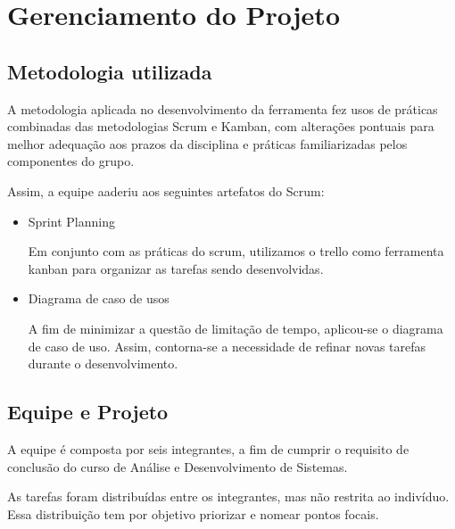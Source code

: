 \chapter{Gerenciamento do Projeto}

	\section{Metodologia utilizada}
		
		A metodologia aplicada no desenvolvimento da ferramenta fez usos de práticas combinadas das metodologias Scrum e Kamban, com alterações pontuais para melhor adequação aos prazos da disciplina e práticas familiarizadas pelos componentes do grupo.

		Assim, a equipe aaderiu aos seguintes artefatos do Scrum:

		\begin{itemize}
			\item 
				Sprint Planning

				Em conjunto com as práticas do scrum, utilizamos o trello como ferramenta kanban para organizar as tarefas sendo desenvolvidas.

			\item 
				Diagrama de caso de usos
				
				A fim de minimizar a questão de limitação de tempo, aplicou-se o diagrama de caso de uso. Assim, contorna-se a necessidade de refinar novas tarefas durante o desenvolvimento.

		\end{itemize}
		
	\section{Equipe e Projeto}

		A equipe é composta por seis integrantes, a fim de cumprir o requisito de conclusão do curso de Análise e Desenvolvimento de Sistemas.

		As tarefas foram distribuídas entre os integrantes, mas não restrita ao indivíduo. Essa distribuição tem por objetivo priorizar e nomear pontos focais.
		
